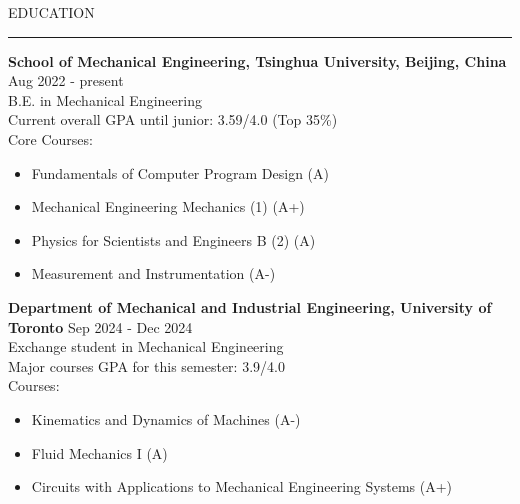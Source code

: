\documentclass{resume} %
\renewenvironment{rSection}[1]{
\sectionskip
\textcolor{TsinghuaPurple}{\MakeUppercase{#1}}
\sectionlineskip
\hrule
\begin{list}{}{
\setlength{\leftmargin}{0em}
}
\item[]
}{
\end{list}
}
\begin{document}
  


\begin{rSection}{Education}

{\bf School of Mechanical Engineering, Tsinghua University, Beijing, China } \hfill {Aug 2022 - present}
\\ 
B.E. in Mechanical Engineering
\\
Current overall GPA until junior: 3.59/4.0 (Top 35\%)
\\
Core Courses: 
\begin{itemize}[itemsep = -0.5em, topsep = -0.5em]
    \item Fundamentals of Computer Program Design (A)
    \item Mechanical Engineering Mechanics (1) (A+)
    \item Physics for Scientists and Engineers B (2) (A)
    \item Measurement and Instrumentation (A-)
\end{itemize}

\vspace{11pt}

{\bf Department of Mechanical and Industrial Engineering, University of Toronto} \hfill {Sep 2024 - Dec 2024}
\\ 
Exchange student in Mechanical Engineering
\\
Major courses GPA for this semester: 3.9/4.0
\\
Courses: 
\begin{itemize}[itemsep = -0.5em, topsep = -0.5em]
    \item Kinematics and Dynamics of Machines (A-)
    \item Fluid Mechanics I (A)
    \item Circuits with Applications to Mechanical Engineering Systems (A+)
\end{itemize}

\end{rSection} 

\end{document}
